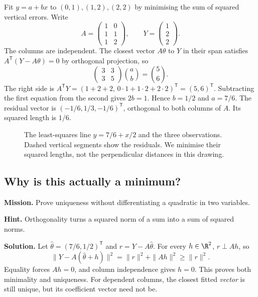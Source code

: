 \begin{examplex}
Fit $y=a+bx$ to $(0,1),(1,2),(2,2)$ by minimising the sum of squared vertical errors. Write
\[
A=\begin{pmatrix}1&0\\1&1\\1&2\end{pmatrix},\qquad
Y=\begin{pmatrix}1\\2\\2\end{pmatrix}.
\]
The columns are independent. The closest vector $A\theta$ to $Y$ in their span satisfies $A^{\mathsf T}(Y-A\theta)=0$ by orthogonal projection, so
\[
\begin{pmatrix}3&3\\3&5\end{pmatrix}\binom ab=\binom56.
\]
The right side is $A^{\mathsf T}Y=(1+2+2,\,0\cdot1+1\cdot2+2\cdot2)^{\mathsf T}=(5,6)^{\mathsf T}$. Subtracting the first equation from the second gives $2b=1$. Hence $b=1/2$ and $a=7/6$. The residual vector is $(-1/6,1/3,-1/6)^{\mathsf T}$, orthogonal to both columns of $A$. Its squared length is $1/6$.
\end{examplex}

\begin{figure}[ht]\centering{}
\caption{The least-squares line $y=7/6+x/2$ and the three observations. Dashed vertical segments show the residuals. We minimise their squared lengths, not the perpendicular distances in this drawing.}\end{figure}

\subsection*{Why is this actually a minimum?}
\textbf{Mission.} Prove uniqueness without differentiating a quadratic in two variables.

\textbf{Hint.} Orthogonality turns a squared norm of a sum into a sum of squared norms.

\textbf{Solution.} Let $\widehat\theta=(7/6,1/2)^{\mathsf T}$ and $r=Y-A\widehat\theta$. For every $h\in\R^2$, $r\perp Ah$, so
\[
\|Y-A(\widehat\theta+h)\|^2=\|r\|^2+\|Ah\|^2\ge\|r\|^2.
\]
Equality forces $Ah=0$, and column independence gives $h=0$. This proves both minimality and uniqueness. For dependent columns, the closest fitted \emph{vector} is still unique, but its coefficient vector need not be.

